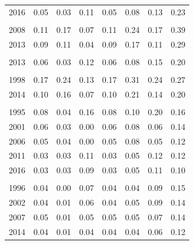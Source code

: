 \documentclass[
  11pt,
a4paper
]{article}
\begin{document}
\begin{longtable}[t]{rrrrrrrr}
\hspace{1em}2016 & 0.05 & 0.03 & 0.11 & 0.05 & 0.08 & 0.13 & 0.23\\
\addlinespace[0.3em]
\multicolumn{8}{l}{\textbf{Sierra Leone}}\\
\hspace{1em}2008 & 0.11 & 0.17 & 0.07 & 0.11 & 0.24 & 0.17 & 0.39\\
\hspace{1em}2013 & 0.09 & 0.11 & 0.04 & 0.09 & 0.17 & 0.11 & 0.29\\
\addlinespace[0.3em]
\multicolumn{8}{l}{\textbf{The Gambia}}\\
\hspace{1em}2013 & 0.06 & 0.03 & 0.12 & 0.06 & 0.08 & 0.15 & 0.20\\
\addlinespace[0.3em]
\multicolumn{8}{l}{\textbf{Togo}}\\
\hspace{1em}1998 & 0.17 & 0.24 & 0.13 & 0.17 & 0.31 & 0.24 & 0.27\\
\hspace{1em}2014 & 0.10 & 0.16 & 0.07 & 0.10 & 0.21 & 0.14 & 0.20\\
\addlinespace[0.3em]
\multicolumn{8}{l}{\textbf{Uganda}}\\
\hspace{1em}1995 & 0.08 & 0.04 & 0.16 & 0.08 & 0.10 & 0.20 & 0.16\\
\hspace{1em}2001 & 0.06 & 0.03 & 0.00 & 0.06 & 0.08 & 0.06 & 0.14\\
\hspace{1em}2006 & 0.05 & 0.04 & 0.00 & 0.05 & 0.08 & 0.05 & 0.12\\
\hspace{1em}2011 & 0.03 & 0.03 & 0.11 & 0.03 & 0.05 & 0.12 & 0.12\\
\hspace{1em}2016 & 0.03 & 0.03 & 0.09 & 0.03 & 0.05 & 0.11 & 0.10\\
\addlinespace[0.3em]
\multicolumn{8}{l}{\textbf{Zambia}}\\
\hspace{1em}1996 & 0.04 & 0.00 & 0.07 & 0.04 & 0.04 & 0.09 & 0.15\\
\hspace{1em}2002 & 0.04 & 0.01 & 0.06 & 0.04 & 0.05 & 0.09 & 0.14\\
\hspace{1em}2007 & 0.05 & 0.01 & 0.05 & 0.05 & 0.05 & 0.07 & 0.14\\
\hspace{1em}2014 & 0.04 & 0.01 & 0.04 & 0.04 & 0.04 & 0.06 & 0.12\\

\end{longtable}
\end{document}
